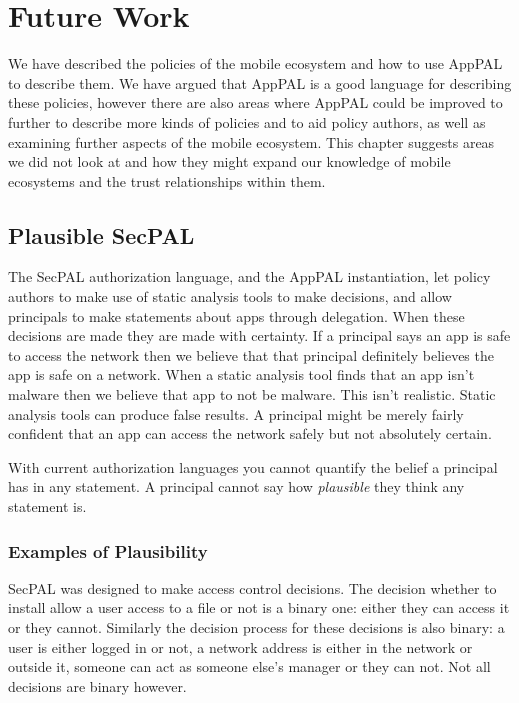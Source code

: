 \documentclass[thesis.tex]{subfiles}
\begin{document}
\chapter{Future Work}
\label{chap:future-work}

We have described the policies of the mobile ecosystem and how to use AppPAL to
describe them. We have argued that AppPAL is a good language for describing
these policies, however there are also areas where AppPAL could be improved to
further to describe more kinds of policies and to aid policy authors, as well as
examining further aspects of the mobile ecosystem. This chapter suggests areas
we did not look at and how they might expand our knowledge of mobile ecosystems
and the trust relationships within them.

\section{Plausible SecPAL}

The SecPAL authorization language, and the AppPAL instantiation, let policy
authors to make use of static analysis tools to make decisions, and allow
principals to make statements about apps through delegation. When these
decisions are made they are made with certainty. If a principal says an app is
safe to access the network then we believe that that principal definitely
believes the app is safe on a network. When a static analysis tool finds that an
app isn't malware then we believe that app to not be malware. This isn't
realistic. Static analysis tools can produce false results. A principal might be
merely fairly confident that an app can access the network safely but not
absolutely certain.

With current authorization languages you cannot quantify the belief a principal
has in any statement. A principal cannot say how \emph{plausible} they think any
statement is.

\subsection{Examples of Plausibility}

SecPAL was designed to make access control decisions. The decision whether to
install allow a user access to a file or not is a binary one: either they can
access it or they cannot. Similarly the decision process for these decisions is
also binary: a user is either logged in or not, a network address is either in
the network or outside it, someone can act as someone else's manager or they can
not. Not all decisions are binary however.
\end{document}
